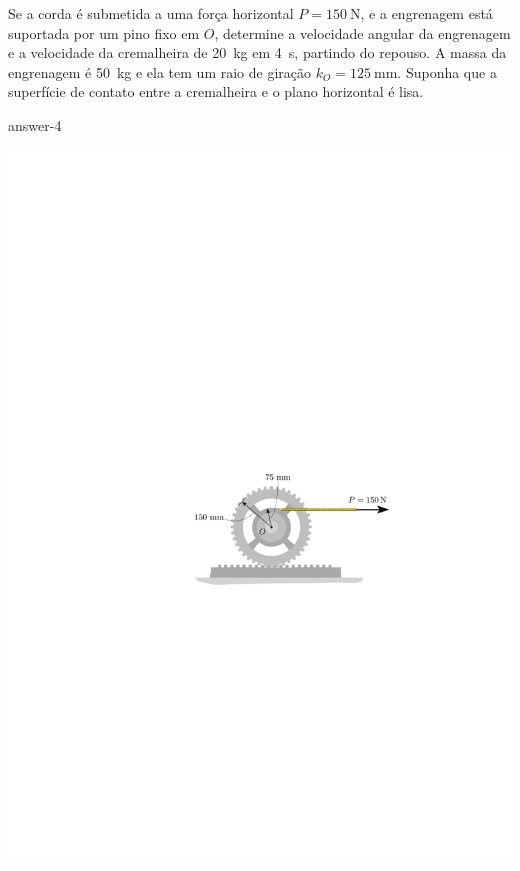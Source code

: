 \item Se a corda é submetida a uma força horizontal $P=\SI{150}{\newton}$, e a engrenagem está suportada por um pino fixo em $O$, determine a velocidade angular da engrenagem e a velocidade da cremalheira de \SI{20}{\kilogram} em \SI{4}{\second}, partindo do repouso. A massa da engrenagem é \SI{50}{\kilogram} e ela tem um raio de giração $k_{O}=\SI{125}{\milli\meter}$. Suponha
que a superfície de contato entre a cremalheira e o plano horizontal é lisa.

{answer-4}

\vspace{-1.85cm}
\begin{flushright}
	\includegraphics[scale=1.2]{../../images/draw_2}
\end{flushright}
